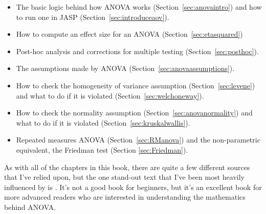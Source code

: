 \begin{itemize} \itemsep -2pt
\item The basic logic behind how ANOVA works (Section~\ref{sec:anovaintro}) and how to run one in JASP (Section~\ref{sec:introduceaov}).
\item How to compute an effect size for an ANOVA (Section~\ref{sec:etasquared})
\item Post-hoc analysis and corrections for multiple testing (Section~\ref{sec:posthoc}).
\item The assumptions made by ANOVA (Section~\ref{sec:anovaassumptions}).
\item How to check the homogeneity of variance assumption (Section~\ref{sec:levene}) and what to do if it is violated (Section~\ref{sec:welchoneway}).
\item How to check the normality assumption (Section~\ref{sec:anovanormality}) and what to do if it is violated (Section~\ref{sec:kruskalwallis}).
\item Repeated measures ANOVA (Section~\ref{sec:RManova}) and the non-parametric equivalent, the Friedman test (Section \ref{sec:Friedman}).
\end{itemize}

As with all of the chapters in this book, there are quite a few different sources that I've relied upon, but the one stand-out text that I've been most heavily influenced by is \textcite{Sahai2000}. It's not a good book for beginners, but it's an excellent book for more advanced readers who are interested in understanding the mathematics behind ANOVA. 


